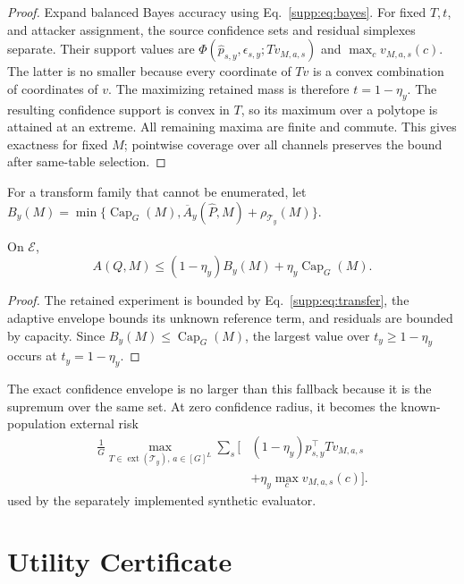 \begin{proof}
Expand balanced Bayes accuracy using Eq.~\eqref{supp:eq:bayes}. For fixed
$T,t$, and attacker assignment, the source confidence sets and residual
simplexes separate. Their support values are
$\Phi(\widehat p_{s,y},\epsilon_{s,y};Tv_{M,a,s})$ and
$\max_cv_{M,a,s}(c)$. The latter is no smaller because every coordinate of
$Tv$ is a convex combination of coordinates of $v$. The maximizing retained
mass is therefore $t=1-\eta_y$. The resulting confidence support is convex in
$T$, so its maximum over a polytope is attained at an extreme. All remaining
maxima are finite and commute. This gives exactness for fixed $M$; pointwise
coverage over all channels preserves the bound after same-table selection.
\end{proof}

For a transform family that cannot be enumerated, let
$B_y(M)=\min\{\operatorname{Cap}_G(M),
\overline A_y(\widehat P,M)+\rho_{\mathcal T_y}(M)\}$.

\begin{corollary}
On $\mathcal E$,
\begin{equation}
 A(Q,M)\leq(1-\eta_y)B_y(M)
 +\eta_y\operatorname{Cap}_G(M).
 \label{supp:eq:shiftbound}
\end{equation}
\end{corollary}

\begin{proof}
The retained experiment is bounded by Eq.~\eqref{supp:eq:transfer}, the
adaptive envelope bounds its unknown reference term, and residuals are bounded
by capacity. Since $B_y(M)\leq\operatorname{Cap}_G(M)$, the largest value over
$t_y\geq1-\eta_y$ occurs at $t_y=1-\eta_y$.
\end{proof}

The exact confidence envelope is no larger than this fallback because it is
the supremum over the same set. At zero confidence radius, it becomes the
known-population external risk
\begin{equation}
 \begin{aligned}
 \frac{1}{G}\max_{T\in\operatorname{ext}(\mathcal T_y),\,a\in[G]^L}
 \sum_s\big[&(1-\eta_y)p_{s,y}^\top T v_{M,a,s}\\
 &+\eta_y\max_cv_{M,a,s}(c)\big].
 \end{aligned}
 \label{supp:eq:exactprivacy}
\end{equation}
used by the separately implemented synthetic evaluator.

\section{Utility Certificate}

